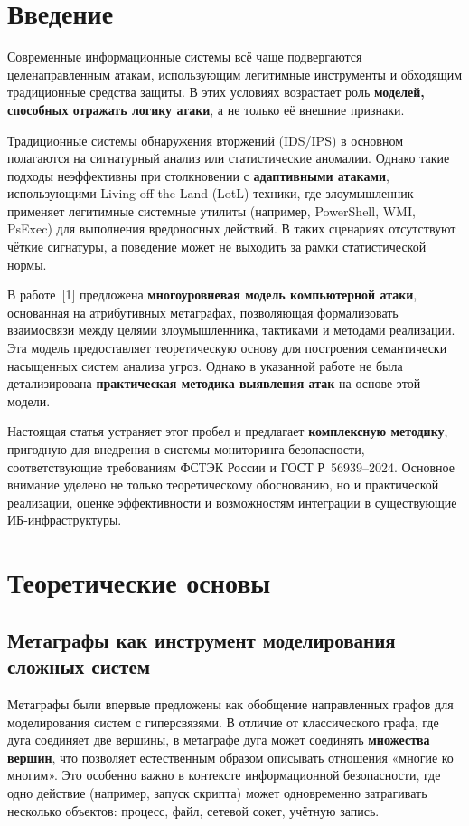 \documentclass[12pt,a4paper]{extarticle}
\begin{document}
\section{Введение}

Современные информационные системы всё чаще подвергаются целенаправленным атакам, использующим легитимные инструменты и обходящим традиционные средства защиты. В этих условиях возрастает роль \textbf{моделей, способных отражать логику атаки}, а не только её внешние признаки.

Традиционные системы обнаружения вторжений (IDS/IPS) в основном полагаются на сигнатурный анализ или статистические аномалии. Однако такие подходы неэффективны при столкновении с \textbf{адаптивными атаками}, использующими Living-off-the-Land (LotL) техники, где злоумышленник применяет легитимные системные утилиты (например, PowerShell, WMI, PsExec) для выполнения вредоносных действий. В таких сценариях отсутствуют чёткие сигнатуры, а поведение может не выходить за рамки статистической нормы.

В работе~[1] предложена \textbf{много\-уров\-не\-вая модель компьютерной атаки}, основанная на атрибу\-тив\-ных метаграфах, позволяющая формализовать взаимосвязи между целями злоумышленника, тактиками и методами реализации. Эта модель предоставляет теоретическую основу для построения семантически насыщенных систем анализа угроз. Однако в указанной работе не была детализирована \textbf{практическая методика выявления атак} на основе этой модели.

Настоящая статья устраняет этот пробел и предлагает \textbf{комплексную методику}, пригодную для внедрения в системы мониторинга безопасности, соответствующие требованиям ФСТЭК России и ГОСТ Р~56939–2024. Основное внимание уделено не только теоретическому обоснованию, но и практической реализации, оценке эффективности и возможностям интеграции в существующие ИБ-инфраструктуры.

\section{Теоретические основы}

\subsection{Метаграфы как инструмент моделирования сложных систем}

Метаграфы были впервые предложены как обобщение направленных графов для моделирования систем с гиперсвязями. В отличие от классического графа, где дуга соединяет две вершины, в метаграфе дуга может соединять \textbf{множества вершин}, что позволяет естественным образом описывать отношения «многие ко многим». Это особенно важно в контексте информационной безопасности, где одно действие (например, запуск скрипта) может одновременно затрагивать несколько объектов: процесс, файл, сетевой сокет, учётную запись.
\end{document}
